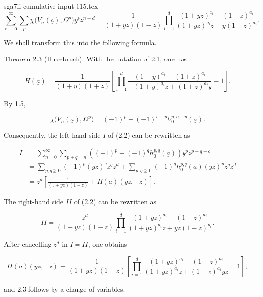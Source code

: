\begin{filecontents*}{sga7ii-cumulative-input-015.tex}
\begin{equation}\tag{2.2}
\sum_{n=0}^{\infty}\sum_p
\chi\bigl(V_n(\underline a),\Omega^p\bigr)y^pz^{n+d}
=\frac{1}{(1+yz)(1-z)}
\prod_{i=1}^d
\frac{(1+yz)^{a_i}-(1-z)^{a_i}}
{(1+yz)^{a_i}z+y(1-z)^{a_i}}.
\end{equation}

We shall transform this into the following formula.

\underline{Theorem} 2.3 (Hirzebruch). \underline{With the notation of 2.1,
one has}

\begin{equation*}
H(\underline a)=\frac{1}{(1+y)(1+z)}\left[
\prod_{i=1}^d
\frac{(1+y)^{a_i}-(1+z)^{a_i}}
{-(1+y)^{a_i}z+(1+z)^{a_i}y}-1\right].
\end{equation*}

By 1.5,

\begin{equation*}
\chi\bigl(V_n(\underline a),\Omega^p\bigr)
=(-1)^p+(-1)^{n-p}h_0^{p,n-p}(\underline a).
\end{equation*}

Consequently, the left-hand side $I$ of (2.2) can be rewritten as

\begin{align*}
I
&=\sum_{n=0}^{\infty}\sum_{p+q=n}
\left((-1)^p+(-1)^q h_0^{p,q}(\underline a)\right)y^pz^{p+q+d}\\
&=\sum_{p,q\geq0}(-1)^p(yz)^pz^qz^d
+\sum_{p,q\geq0}(-1)^q h_0^{p,q}(\underline a)(yz)^pz^qz^d\\
&=z^d\left[\frac{1}{(1+yz)(1-z)}
+H(\underline a)(yz,-z)\right].
\end{align*}

The right-hand side $II$ of (2.2) can be rewritten as

\begin{equation*}
II=\frac{z^d}{(1+yz)(1-z)}
\prod_{i=1}^d
\frac{(1+yz)^{a_i}-(1-z)^{a_i}}
{(1+yz)^{a_i}z+yz(1-z)^{a_i}}.
\end{equation*}

After cancelling $z^d$ in $I=II$, one obtains

\begin{equation*}
H(\underline a)(yz,-z)
=\frac{1}{(1+yz)(1-z)}\left[
\prod_{i=1}^d
\frac{(1+yz)^{a_i}-(1-z)^{a_i}}
{(1+yz)^{a_i}z+(1-z)^{a_i}yz}-1\right],
\end{equation*}

and 2.3 follows by a change of variables.



\end{filecontents*}
